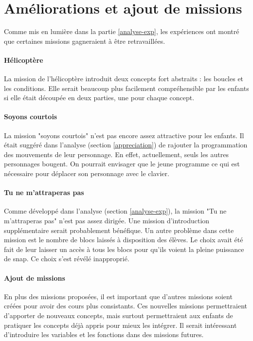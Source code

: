 \section{Améliorations et ajout de missions}
Comme mis en lumière dans la partie \ref{analyse-exp}, les expériences ont montré que certaines \glspl{mission} gagneraient à être retravaillées.

\paragraph{Hélicoptère}
La \gls{mission} de l'hélicoptère introduit deux concepts fort abstraits : les boucles et les conditions. Elle serait beaucoup plus facilement compréhensible par les enfants si elle était découpée en deux parties, une pour chaque concept.

\paragraph{Soyons courtois}
La \gls{mission} "soyons courtois" n'est pas encore assez attractive pour les enfants. Il était suggéré dans l'analyse (section \ref{appreciation}) de rajouter la programmation des mouvements de leur personnage. En effet, actuellement, seuls les autres personnages bougent. On pourrait envisager que le jeune programme ce qui est nécessaire pour déplacer son personnage avec le clavier.

\paragraph{Tu ne m'attraperas pas}
Comme développé dans l'analyse (section \ref{analyse-exp}), la \gls{mission} "Tu ne m'attraperas pas" n'est pas assez dirigée. Une \gls{mission} d'introduction supplémentaire serait probablement bénéfique. Un autre problème dans cette \gls{mission} est le nombre de \glspl{bloc}  laissés à disposition des élèves. Le choix avait été fait de leur laisser un accès à tous les \glspl{bloc}  pour qu'ils voient la pleine puissance de \gls{snap}. Ce choix s'est révélé inapproprié.

\paragraph{Ajout de missions}
En plus des \glspl{mission} proposées, il est important que d'autres \glspl{mission} soient créées pour avoir des cours plus consistants. Ces nouvelles \glspl{mission} permettraient d'apporter de nouveaux concepts, mais surtout permettraient aux enfants de pratiquer les concepts déjà appris pour mieux les intégrer. Il serait intéressant d'introduire les variables et les fonctions dans des \glspl{mission} futures.

